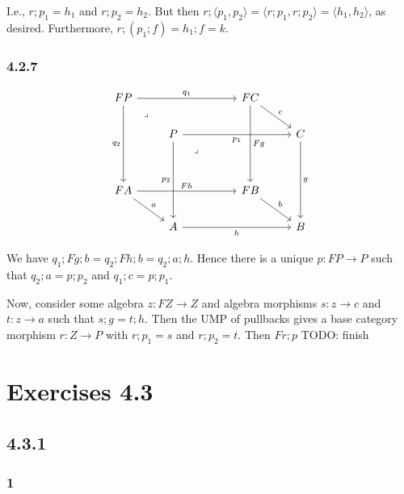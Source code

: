 \documentclass{article}
\begin{document}
I.e., $r;p_1 = h_1$ and $r;p_2 = h_2$. But then $r;\langle p_1, p_2 \rangle = \langle r;p_1, r;p_2 \rangle = \langle h_1, h_2 \rangle$, as desired. Furthermore, $r;(p_1;f) = h_1;f = k$.

\subsubsection*{4.2.7}

\[\begin{tikzcd}
	FP &&& FC \\
	& P &&& C \\
	\\
	FA &&& FB \\
	& A &&& B
	\arrow["a", from=4-1, to=5-2]
	\arrow["h"', from=5-2, to=5-5]
	\arrow["g", from=2-5, to=5-5]
	\arrow["c", from=1-4, to=2-5]
	\arrow["b", from=4-4, to=5-5]
	\arrow["{p_2}"', from=2-2, to=5-2]
	\arrow["{p_1}"', from=2-2, to=2-5]
	\arrow["Fg", from=1-4, to=4-4]
	\arrow["Fh", from=4-1, to=4-4]
	\arrow["{q_2}"', from=1-1, to=4-1]
	\arrow["{q_1}", from=1-1, to=1-4]
	\arrow["\lrcorner"{anchor=center, pos=0.125}, draw=none, from=2-2, to=5-5]
	\arrow["\lrcorner"{anchor=center, pos=0.125}, draw=none, from=1-1, to=4-4]
\end{tikzcd}\]

We have $q_1;Fg;b = q_2;Fh;b = q_2;a;h$. Hence there is a unique $p : FP \to P$ such that $q_2;a = p;p_2$ and $q_1;c=p;p_1$. 

Now, consider some algebra $z : FZ \to Z$ and algebra morphisms $s : z \to c$ and $t : z \to a$ such that $s;g = t;h$.
Then the UMP of pullbacks gives a base category morphism $r : Z \to P$ with $r;p_1 = s$ and $r;p_2 = t$.
Then $Fr;p$ TODO: finish

\section*{Exercises 4.3}

\subsection*{4.3.1}

\subsubsection*{1}
\end{document}
